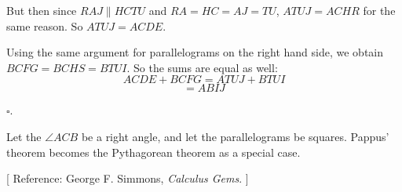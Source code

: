 \documentclass[11pt, oneside]{article}
\begin{document}
But then since $RAJ \parallel HCTU$ and $RA = HC = AJ = TU$, $ATUJ = ACHR$ for the same reason.  So $ATUJ = ACDE$.

Using the same argument for parallelograms on the right hand side, we obtain $BCFG = BCHS = BTUI$.  So the sums are equal as well:
\[ ACDE + BCFG = ATUJ + BTUI \]
\[ = ABIJ \]

$\square$.

Let the $\angle ACB$ be a right angle, and let the parallelograms be squares.  Pappus' theorem becomes the Pythagorean theorem as a special case.

[ Reference:  George F. Simmons, \emph{Calculus Gems}. ]
\end{document}
